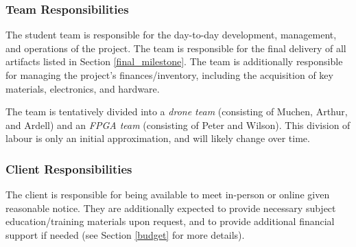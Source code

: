 \subsubsection{Team Responsibilities}
The student team is responsible for the day-to-day development, management, and
operations of the project. The
team is responsible for the final delivery of all artifacts listed in Section
\ref{final_milestone}.
The team is additionally responsible for managing the project's finances/inventory,
including the acquisition of key materials, electronics, and hardware.

The team is tentatively divided into a \textit{drone team} (consisting of Muchen, Arthur, and Ardell) and an \textit{FPGA team} (consisting of Peter and Wilson). This division of labour is only an initial approximation, and will likely change over time.

\subsubsection{Client Responsibilities}
The client is responsible for being available to meet in-person or online
given reasonable notice. They are additionally expected to provide necessary subject education/training materials upon request, and to provide additional financial support if needed (see Section \ref{budget} for
more details).
